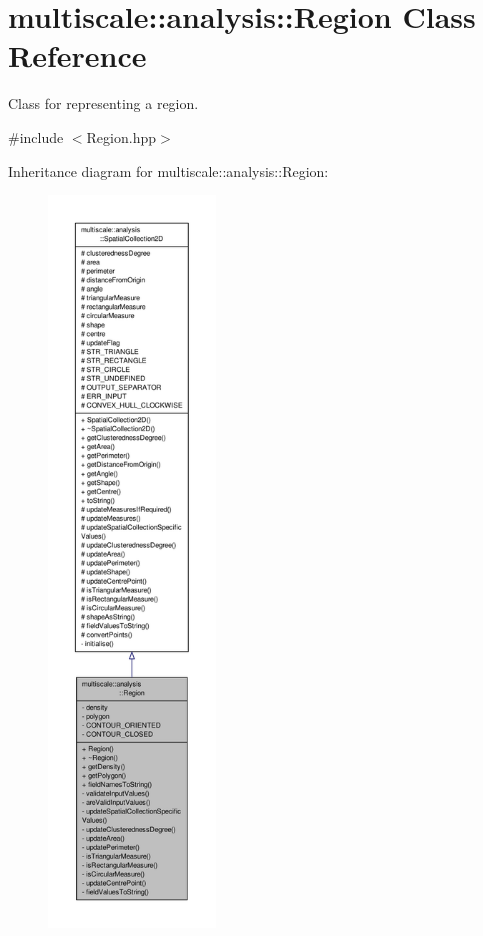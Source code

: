 \hypertarget{classmultiscale_1_1analysis_1_1Region}{\section{multiscale\-:\-:analysis\-:\-:Region Class Reference}
\label{classmultiscale_1_1analysis_1_1Region}
}


Class for representing a region.  




{\ttfamily \#include $<$Region.\-hpp$>$}



Inheritance diagram for multiscale\-:\-:analysis\-:\-:Region\-:\nopagebreak
\begin{figure}[H]
\begin{center}
\leavevmode
\includegraphics[height=550pt]{classmultiscale_1_1analysis_1_1Region__inherit__graph}
\end{center}
\end{figure}


